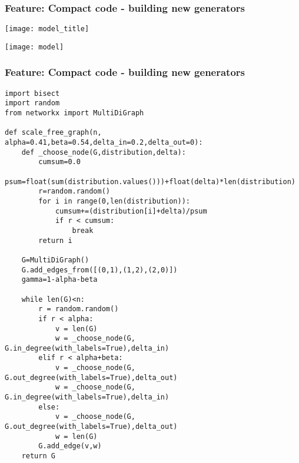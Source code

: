 \documentclass[xcolor=dvipsnames, 9pt]{beamer}
\begin{document}



\begin{frame}[fragile]
\frametitle{Feature: Compact code - building new generators}
\centerline{\texttt{[image: model\_title]}}
\centerline{\texttt{[image: model]}}
\end{frame}

\begin{frame}[fragile]
\frametitle{Feature: Compact code - building new generators}
\begin{block}{}
\tiny
\begin{verbatim}
import bisect
import random
from networkx import MultiDiGraph

def scale_free_graph(n, alpha=0.41,beta=0.54,delta_in=0.2,delta_out=0):
    def _choose_node(G,distribution,delta):
        cumsum=0.0
        psum=float(sum(distribution.values()))+float(delta)*len(distribution)
        r=random.random()
        for i in range(0,len(distribution)):
            cumsum+=(distribution[i]+delta)/psum
            if r < cumsum:  
                break
        return i

    G=MultiDiGraph()
    G.add_edges_from([(0,1),(1,2),(2,0)])
    gamma=1-alpha-beta

    while len(G)<n:
        r = random.random()
        if r < alpha:
            v = len(G) 
            w = _choose_node(G, G.in_degree(with_labels=True),delta_in)
        elif r < alpha+beta:
            v = _choose_node(G, G.out_degree(with_labels=True),delta_out)
            w = _choose_node(G, G.in_degree(with_labels=True),delta_in)
        else:
            v = _choose_node(G, G.out_degree(with_labels=True),delta_out)
            w = len(G) 
        G.add_edge(v,w)
    return G

\end{verbatim}
\end{block}
\end{frame}
\end{document}
